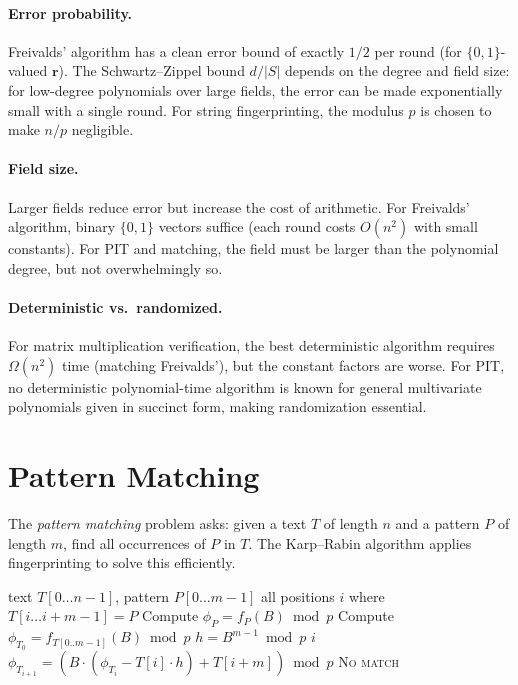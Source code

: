 \documentclass[twoside,12pt]{book}
\theoremstyle{plain}
\theoremstyle{definition}
\theoremstyle{remark}
\begin{document}
\paragraph{Error probability.}
Freivalds' algorithm has a clean error bound of exactly $1/2$ per round (for $\{0,1\}$-valued $\mathbf{r}$). The Schwartz--Zippel bound $d/|S|$ depends on the degree and field size: for low-degree polynomials over large fields, the error can be made exponentially small with a single round. For string fingerprinting, the modulus $p$ is chosen to make $n/p$ negligible.

\paragraph{Field size.}
Larger fields reduce error but increase the cost of arithmetic. For Freivalds' algorithm, binary $\{0,1\}$ vectors suffice (each round costs $O(n^2)$ with small constants). For PIT and matching, the field must be larger than the polynomial degree, but not overwhelmingly so.

\paragraph{Deterministic vs.\ randomized.}
For matrix multiplication verification, the best deterministic algorithm requires $\Omega(n^2)$ time (matching Freivalds'), but the constant factors are worse. For PIT, no deterministic polynomial-time algorithm is known for general multivariate polynomials given in succinct form, making randomization essential.


\section{Pattern Matching}
\label{sec:pattern-matching}

The \emph{pattern matching} problem asks: given a text $T$ of length $n$ and a pattern $P$ of length $m$, find all occurrences of $P$ in $T$. The Karp--Rabin algorithm applies fingerprinting to solve this efficiently.

\begin{algorithm}[H]
\caption{Karp--Rabin Pattern Matching}
\label{alg:karp-rabin}
\begin{algorithmic}[1]
\Require text $T[0 \ldots n-1]$, pattern $P[0 \ldots m-1]$
\Ensure all positions $i$ where $T[i \ldots i+m-1] = P$
\State Compute $\phi_P = f_P(B) \bmod p$ 
\State Compute $\phi_{T_0} = f_{T[0..m-1]}(B) \bmod p$ 
\State $h = B^{m-1} \bmod p$ 
    \State {}
      \State \Return $i$
    \EndIf
  \EndIf
    \State $\phi_{T_{i+1}} = (B \cdot (\phi_{T_i} - T[i] \cdot h) + T[i+m]) \bmod p$
  \EndIf
\EndFor
\State \Return \textsc{No match}
\end{algorithmic}
\end{algorithm}
\end{document}
